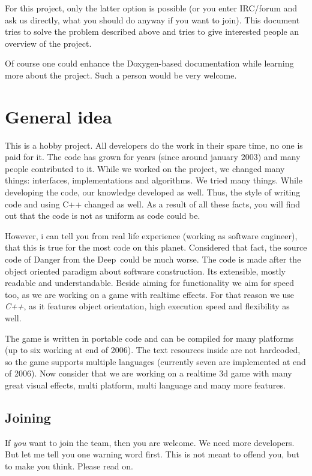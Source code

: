 \documentclass[english,a4paper,12pt]{report}
\newcommand{\dftd}{\textsf{Danger from the Deep}}
\begin{document}
For this project, only the latter option is possible (or you enter
IRC/forum and ask us directly, what you should do anyway if you want to
join). This document tries to solve the problem described above and
tries to give interested people an overview of the project.

Of course one could enhance the Doxygen-based documentation while
learning more about the project. Such a person would be very welcome.

\chapter{General idea}

This is a hobby project. All developers do the work in their spare time,
no one is paid for it. The code has grown for years (since around
january 2003) and many people contributed to it. While we worked on the
project, we changed many things: interfaces, implementations and
algorithms. We tried many things. While developing the code, our
knowledge developed as well. Thus, the style of writing code and using
C++ changed as well. As a result of all these facts, you will find out
that the code is not as uniform as code could be.

However, i can tell you from real life experience (working as software
engineer), that this is true for the most code on this planet.
Considered that fact, the source code of \dftd\ could be much worse. The
code is made after the object oriented paradigm about software
construction. Its extensible, mostly readable and understandable. Beside
aiming for functionality we aim for speed too, as we are working on a
game with realtime effects.  For that reason we use \emph{C++}, as it
features object orientation, high execution speed and flexibility as
well.

The game is written in portable code and can be compiled for many
platforms (up to six working at end of 2006). The text resources inside
are not hardcoded, so the game supports multiple languages (currently
seven are implemented at end of 2006). Now consider that we are working
on a realtime 3d game with many great visual effects, multi platform,
multi language and many more features.

\section{Joining}

If \emph{you} want to join the team, then you are welcome. We need more
developers. But let me tell you one warning word first. This is not
meant to offend you, but to make you think. Please read on.
\end{document}
